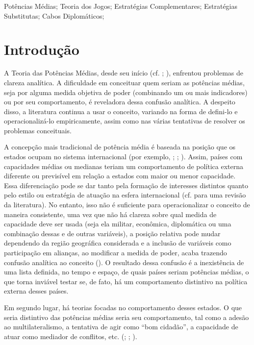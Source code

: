 \documentclass[]{interact}
\theoremstyle{plain}%
\theoremstyle{definition}
\theoremstyle{remark}
\begin{document}
\begin{keywords}
Potências Médias; Teoria dos Jogos; Estratégias Complementares;
Estratégias Substitutas; Cabos Diplomáticos;
\end{keywords}

\hypertarget{introduuxe7uxe3o}{%
\section{Introdução}\label{introduuxe7uxe3o}}

A Teoria das Potências Médias, desde seu início (cf.
\citet{chaudhuri_1969}; \citet{holbraad_71}), enfrentou problemas de
clareza analítica. A dificuldade em conceituar quem seriam as potências
médias, seja por alguma medida objetiva de poder (combinando um ou mais
indicadores) ou por seu comportamento, é reveladora dessa confusão
analítica. A despeito disso, a literatura continua a usar o conceito,
variando na forma de defini-lo e operacionalizá-lo empiricamente, assim
como nas várias tentativas de resolver os problemas conceituais.

A concepção mais tradicional de potência média é baseada na posição que
os estados ocupam no sistema internacional (por exemplo,
\citet{holbraad_84}; \citet{cooper_etal_93}; \citet{shin_12}). Assim,
países com capacidades médias ou medianas teriam um comportamento de
política externa diferente ou previsível em relação a estados com maior
ou menor capacidade. Essa diferenciação pode se dar tanto pela formação
de interesses distintos quanto pelo estilo ou estratégia de atuação na
esfera internacional (cf. \citet{cooper_11} para uma revisão da
literatura). No entanto, isso não é suficiente para operacionalizar o
conceito de maneira consistente, uma vez que não há clareza sobre qual
medida de capacidade deve ser usada (seja ela militar, econômica,
diplomática ou uma combinação dessas e de outras variáveis), a posição
relativa pode mudar dependendo da região geográfica considerada e a
inclusão de variáveis como participação em alianças, ao modificar a
medida de poder, acaba trazendo confusão analítica ao conceito
(\citet{cooper_11}). O resultado dessa confusão é a inexistência de uma
lista definida, no tempo e espaço, de quais países seriam potências
médias, o que torna inviável testar se, de fato, há um comportamento
distintivo na política externa desses países.

Em segundo lugar, há teorias focadas no comportamento desses estados. O
que seria distintivo das potências médias seria seu comportamento, tal
como a adesão ao multilateralismo, a tentativa de agir como ``bom
cidadão'', a capacidade de atuar como mediador de conflitos, etc.
(\citet{schiavon_dominguez_16}; \citet{stephen_13}; \citet{welsh_04}).
\end{document}

